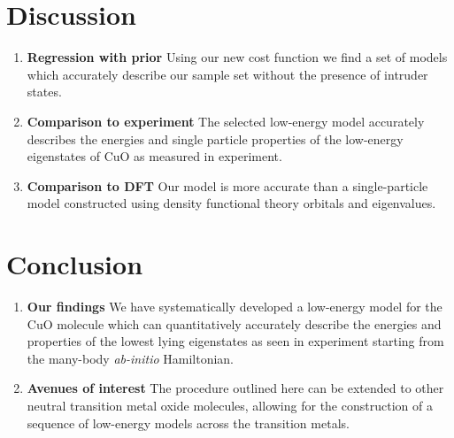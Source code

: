\documentclass{article}
\begin{document}
\section{Discussion}
\begin{enumerate}
\item \textbf{Regression with prior} Using our new cost function we find a set of models which accurately describe our sample set without the presence of intruder states.

\item \textbf{Comparison to experiment} The selected low-energy model accurately describes the energies and single particle properties of the low-energy eigenstates of CuO as measured in experiment.

\item \textbf{Comparison to DFT} Our model is more accurate than a single-particle model constructed using density functional theory orbitals and eigenvalues.
\end{enumerate}

\section{Conclusion}
\begin{enumerate}
\item \textbf{Our findings} We have systematically developed a low-energy model for the CuO molecule which can quantitatively accurately describe the energies and properties of the lowest lying eigenstates as seen in experiment starting from the many-body \textit{ab-initio} Hamiltonian.

\item \textbf{Avenues of interest} The procedure outlined here can be extended to other neutral transition metal oxide molecules, allowing for the construction of a sequence of low-energy models across the transition metals.
\end{enumerate}

\end{document}
